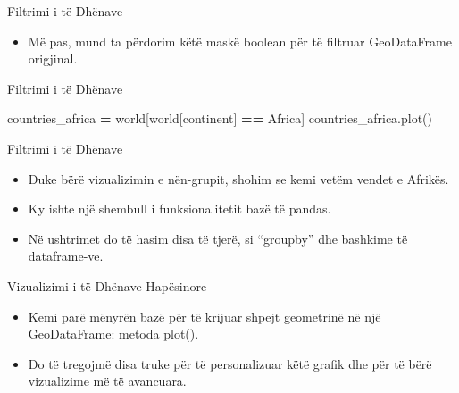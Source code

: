 \documentclass[
  ignorenonframetext,
]{beamer}
\newenvironment{Shaded}{\begin{snugshade}}{\end{snugshade}}
\newcommand{\NormalTok}[1]{#1}
\newcommand{\OperatorTok}[1]{\textcolor[rgb]{0.81,0.36,0.00}{\textbf{#1}}}
\newcommand{\StringTok}[1]{\textcolor[rgb]{0.31,0.60,0.02}{#1}}
\providecommand{\tightlist}{%
  \setlength{\itemsep}{0pt}\setlength{\parskip}{0pt}}
\begin{document}
\begin{frame}{Filtrimi i të Dhënave}
\protect\hypertarget{filtrimi-i-tuxeb-dhuxebnave-4}{}
\begin{itemize}
\tightlist
\item
  Më pas, mund ta përdorim këtë maskë boolean për të filtruar
  GeoDataFrame origjinal.
\end{itemize}
\end{frame}

\begin{frame}[fragile]{Filtrimi i të Dhënave}
\protect\hypertarget{filtrimi-i-tuxeb-dhuxebnave-5}{}

\begin{Shaded}
\begin{Highlighting}[]
\NormalTok{countries\_africa }\OperatorTok{=}\NormalTok{ world[world[}\StringTok{\textquotesingle{}continent\textquotesingle{}}\NormalTok{] }\OperatorTok{==} \StringTok{\textquotesingle{}Africa\textquotesingle{}}\NormalTok{]}
\NormalTok{countries\_africa.plot()  }
\end{Highlighting}
\end{Shaded}
\end{frame}

\begin{frame}{Filtrimi i të Dhënave}
\protect\hypertarget{filtrimi-i-tuxeb-dhuxebnave-6}{}
\begin{itemize}
\item
  Duke bërë vizualizimin e nën-grupit, shohim se kemi vetëm vendet e
  Afrikës.
\item
  Ky ishte një shembull i funksionalitetit bazë të pandas.
\item
  Në ushtrimet do të hasim disa të tjerë, si ``groupby'' dhe bashkime të
  dataframe-ve.
\end{itemize}
\end{frame}

\begin{frame}{Vizualizimi i të Dhënave Hapësinore}
\protect\hypertarget{vizualizimi-i-tuxeb-dhuxebnave-hapuxebsinore}{}
\begin{itemize}
\item
  Kemi parë mënyrën bazë për të krijuar shpejt geometrinë në një
  GeoDataFrame: metoda plot().
\item
  Do të tregojmë disa truke për të personalizuar këtë grafik dhe për të
  bërë vizualizime më të avancuara.
\end{itemize}
\end{frame}
\end{document}
